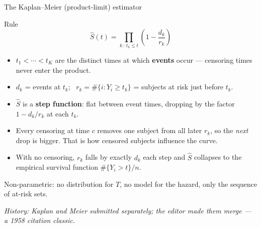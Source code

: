 \documentclass[aspectratio=169,11pt]{beamer}
\begin{document}
\begin{frame}{The Kaplan--Meier (product-limit) estimator}
  \scriptsize
  \begin{block}{Rule}
    \[
      \boxed{\;\hat S(t)=\prod_{k\,:\,t_k\le t}\left(1-\frac{d_k}{r_k}\right)\;}
    \]
  \end{block}
  \begin{readme}
    \begin{itemize}
      \item $t_1<\cdots<t_K$ are the distinct times at which \textbf{events} occur ---
            censoring times never enter the product.
      \item $d_k$ = events at $t_k$; \ $r_k=\#\{i: Y_i\ge t_k\}$ = subjects at risk just
            before $t_k$.
      \item $\hat S$ is a \textbf{step function}: flat between event times, dropping by
            the factor $1-d_k/r_k$ at each $t_k$.
      \item Every censoring at time $c$ removes one subject from all later $r_k$, so the
            \emph{next} drop is bigger. That is how censored subjects influence the curve.
      \item With no censoring, $r_k$ falls by exactly $d_k$ each step and $\hat S$
            collapses to the empirical survival function $\#\{Y_i>t\}/n$.
    \end{itemize}
  \end{readme}
  \begin{takeaway}
    Non-parametric: no distribution for $T$, no model for the hazard, only the
    sequence of at-risk sets.
  \end{takeaway}
  \par{\tiny\itshape\color{gray}History: Kaplan and Meier submitted
  separately; the editor made them merge --- a 1958 citation classic.}
\end{frame}
\end{document}
